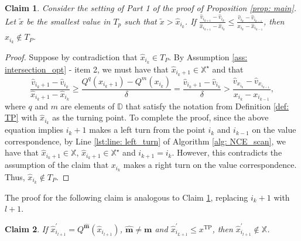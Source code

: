 \documentclass[12pt]{article}
\newtheorem{claim}{Claim}
\newcommand{\DChSet}{\mathbb{D}}
\newcommand{\mVecVar}{\mathbf{m}}
\begin{document}


\begin{claim}\label{clm: x_k_not_TP_1}
Consider the setting of Part 1 of the proof of Proposition \ref{prop: main}. Let $\tilde{x}$ be the smallest value in $T_{p}$ such that $\tilde{x}> \hat{x}_{i_{k}}$. If $\frac{\hat{v}_{i_{k+1}} - \hat{v}_{i_k}}{\hat{x}_{i_{k+1}} -\hat{x}_{i_k}} \leq \frac{\hat{v}_{i_k} - \hat{v}_{i_{k-1}}}{x_{i_k}-\hat{x}_{i_{k-1}}}$, then $\hat{x}_{i_{k}}\not\in T_{P}$.
\end{claim}

\begin{proof}
Suppose by contradiction that  $\hat{x}_{i_{k}} \in T_{P}$. By Assumption \ref{ass: intersection_opt} - item 2, we must have that $\hat{x}_{i_{k}+1}\in \mathbb{X}^{\star}$ and that
%
\begin{equation}
\frac{\hat{v}_{i_{k}+1} - \hat{v}_{i_{k}}}{\hat{x}_{i_{k}+1} - \hat{x}_{i_{k}}} \geq \frac{Q^{q}(x_{i_{k}+1}) - Q^{m}(x_{i_{k}})}{\delta} = \frac{\hat{v}_{i_{k}+1} - \hat{v}_{i_k}}{\delta} > 
\frac{\hat{v}_{x_{i_k}} - \hat{v}_{x_{i_{k-1}}}}{x_{i_{k}} - x_{i_{k-1}}},
\end{equation}
%
where $q$ and $m$ are elements of $\DChSet$ that satisfy the notation from Definition \ref{def: TP} with $\hat{x}_{i_{k}}$ as the turning point. To complete the proof, since the above equation implies $i_{k}+1$ makes a left turn from the point $i_{k}$ and  $i_{k-1}$ on the value correspondence, by Line \ref{lst:line: left_turn} of Algorithm \ref{alg: NCE_scan}, we have that $\hat{x}_{i_{k}+1}\in \mathbb{X}$, $\hat{x}_{i_{k}+1}\in \mathbb{X}^{\star}$ and $i_{k+1} = i_{k}$. However, this contradicts the assumption of the claim that $x_{i_{k}}$ makes a right turn on the value correspondence. Thus, $\hat{x}_{i_{k}}\not\in T_{P}$. \end{proof}

The proof for the following claim is analogous to Claim \ref{clm: x_k_not_TP_1}, replacing $i_{k}+1$ with $l+1$. 

\begin{claim}\label{clm: jump_detect}
If $\hat{x}^{\prime}_{i_{l+1}} = Q^{\hat{\mVecVar}}(\hat{x}_{i_{l+1}})$, $\hat{\mVecVar} \not= \mVecVar$ and $\hat{x}^{\prime}_{i_{L+1}}\leq x^{\text{TP}}$, then $\hat{x}^{\prime}_{i_{l+1}}\not \in \mathbb{X}$. 
\end{claim}
\end{document}
